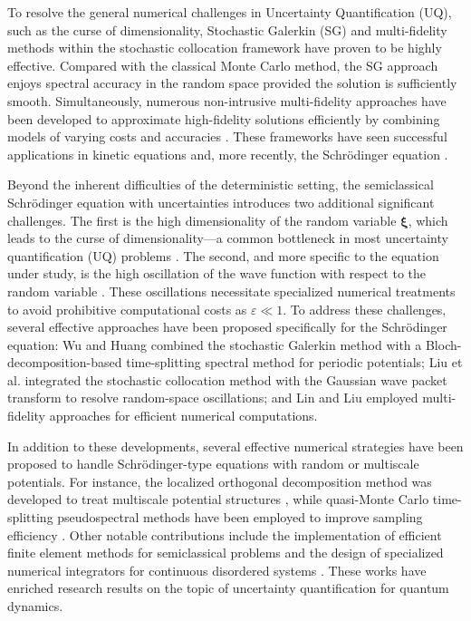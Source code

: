 \documentclass[preprint,11pt]{elsarticle}
\begin{document}
To resolve the general numerical challenges in Uncertainty Quantification (UQ), such as the curse of dimensionality, Stochastic Galerkin (SG) and multi-fidelity methods within the stochastic collocation framework \cite{Babuska2010siamrev, Giles2008or, Mishra2016siamjuq} have proven to be highly effective. Compared with the classical Monte Carlo method, the SG approach enjoys spectral accuracy in the random space provided the solution is sufficiently smooth. Simultaneously, numerous non-intrusive multi-fidelity approaches have been developed to approximate high-fidelity solutions efficiently by combining models of varying costs and accuracies \cite{Survey2018, Zhu2014siamjuq}. These frameworks have seen successful applications in kinetic equations \cite{ DLPZ25, Dimarco2019jcp, Liu2020jcp, YL26} and, more recently, the Schrödinger equation \cite{lin2025class}.

Beyond the inherent difficulties of the deterministic setting, the semiclassical Schrödinger equation with uncertainties introduces two additional significant challenges. The first is the high dimensionality of the random variable $\bm{\xi}$, which leads to the curse of dimensionality—a common bottleneck in most uncertainty quantification (UQ) problems \cite{wuBlochDecompositionbasedStochastic2016}. The second, and more specific to the equation under study, is the high oscillation of the wave function with respect to the random variable \cite{jinGaussianWavePacket2020}. These oscillations necessitate specialized numerical treatments to avoid prohibitive computational costs as $\varepsilon \ll 1$. To address these challenges, several effective approaches have been proposed specifically for the Schrödinger equation: Wu and Huang \cite{wuBlochDecompositionbasedStochastic2016} combined the stochastic Galerkin method with a Bloch-decomposition-based time-splitting spectral method for periodic potentials; Liu et al. \cite{jinGaussianWavePacket2020} integrated the stochastic collocation method with the Gaussian wave packet transform to resolve random-space oscillations; and Lin and Liu \cite{lin2025class} employed multi-fidelity approaches for efficient numerical computations.

In addition to these developments, several effective numerical strategies have been proposed to handle Schr\"odinger-type equations with random or multiscale potentials. For instance, the localized orthogonal decomposition method was developed to treat multiscale potential structures \cite{WZ2022}, while quasi-Monte Carlo time-splitting pseudospectral methods have been employed to improve sampling efficiency \cite{WZZ2024}. Other notable contributions include the implementation of efficient finite element methods for semiclassical problems \cite{JLZC25, PZ2025} and the design of specialized numerical integrators for continuous disordered systems \cite{Zhao2021}. These works have  enriched research results on the topic of uncertainty quantification for quantum dynamics.
\end{document}
